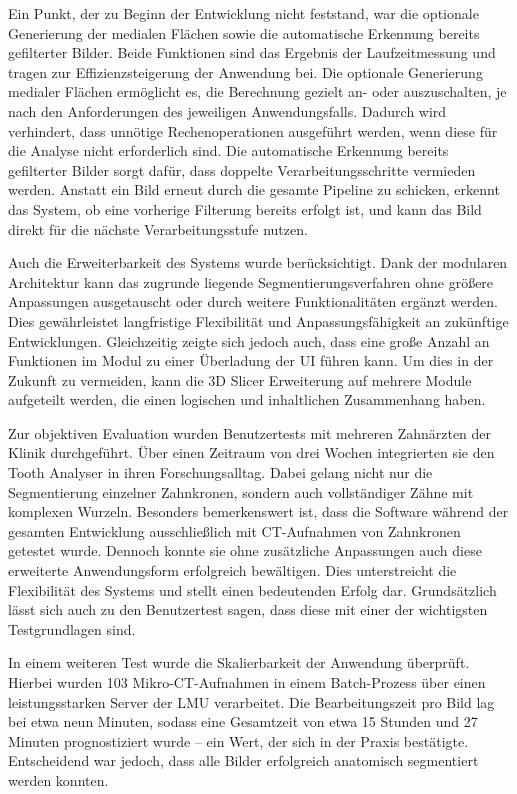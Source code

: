 Ein Punkt, der zu Beginn der Entwicklung nicht feststand, war die optionale Generierung
der medialen Flächen sowie die automatische Erkennung bereits gefilterter Bilder.
Beide Funktionen sind das Ergebnis der Laufzeitmessung und tragen zur
Effizienzsteigerung der Anwendung bei. Die optionale Generierung medialer Flächen
ermöglicht es, die Berechnung gezielt an- oder auszuschalten, je nach den
Anforderungen des jeweiligen Anwendungsfalls. Dadurch wird verhindert, dass
unnötige Rechenoperationen ausgeführt werden, wenn diese für die Analyse nicht erforderlich
sind. Die automatische Erkennung bereits gefilterter Bilder sorgt dafür, dass doppelte
Verarbeitungsschritte vermieden werden. Anstatt ein Bild erneut durch die
gesamte Pipeline zu schicken, erkennt das System, ob eine vorherige Filterung
bereits erfolgt ist, und kann das Bild direkt für die nächste Verarbeitungsstufe
nutzen.

Auch die Erweiterbarkeit des Systems wurde berücksichtigt. Dank der modularen
Architektur kann das zugrunde liegende Segmentierungsverfahren ohne größere
Anpassungen ausgetauscht oder durch weitere Funktionalitäten ergänzt werden. Dies
gewährleistet langfristige Flexibilität und Anpassungsfähigkeit an zukünftige Entwicklungen.
Gleichzeitig zeigte sich jedoch auch, dass eine große Anzahl an Funktionen im Modul
zu einer Überladung der \ac{UI} führen kann. Um dies in der Zukunft zu vermeiden,
kann die 3D Slicer Erweiterung auf mehrere Module aufgeteilt werden, die einen logischen
und inhaltlichen Zusammenhang haben.

Zur objektiven Evaluation wurden Benutzertests mit mehreren Zahnärzten der Klinik
durchgeführt. Über einen Zeitraum von drei Wochen integrierten sie den Tooth
Analyser in ihren Forschungsalltag. Dabei gelang nicht nur die Segmentierung einzelner
Zahnkronen, sondern auch vollständiger Zähne mit komplexen Wurzeln. Besonders bemerkenswert
ist, dass die Software während der gesamten Entwicklung ausschließlich mit \ac{CT}-Aufnahmen
von Zahnkronen getestet wurde. Dennoch konnte sie ohne zusätzliche Anpassungen
auch diese erweiterte Anwendungsform erfolgreich bewältigen. Dies unterstreicht die
Flexibilität des Systems und stellt einen bedeutenden Erfolg dar. Grundsätzlich
lässt sich auch zu den Benutzertest sagen, dass diese mit einer der wichtigsten Testgrundlagen
sind.

In einem weiteren Test wurde die Skalierbarkeit der Anwendung überprüft. Hierbei
wurden 103 Mikro-\ac{CT}-Aufnahmen in einem Batch-Prozess über einen leistungsstarken
Server der LMU verarbeitet. Die Bearbeitungszeit pro Bild lag bei etwa neun
Minuten, sodass eine Gesamtzeit von etwa 15 Stunden und 27 Minuten prognostiziert
wurde – ein Wert, der sich in der Praxis bestätigte. Entscheidend war jedoch,
dass alle Bilder erfolgreich anatomisch segmentiert werden konnten.

